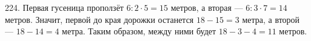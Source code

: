224. Первая гусеница проползёт $6:2\cdot5=15$ метров, а вторая --- $6:3\cdot7=14$ метров. Значит, первой до края дорожки останется $18-15=3$ метра, а второй --- $18-14=4$ метра. Таким образом, между ними будет $18-3-4=11$ метров.\\

